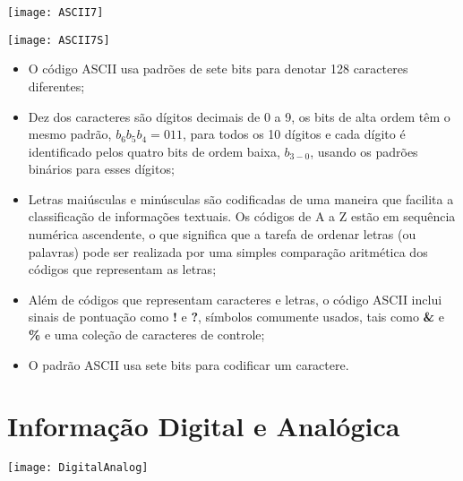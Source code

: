 \begin{frame}{\insertsection}
    \centering
    \texttt{[image: ASCII7]} 
\end{frame}

\begin{frame}{\insertsection}
    \centering
    \texttt{[image: ASCII7S]} 
\end{frame}

\begin{frame}{\insertsection}
    \begin{itemize}
        \item O código ASCII usa padrões de sete bits para denotar 128 caracteres diferentes; 
        \item Dez dos caracteres são dígitos decimais de 0 a 9, os bits de alta ordem têm o mesmo padrão, $b_6b_5b_4 = 011$, para todos os 10 dígitos e cada dígito é identificado pelos quatro bits de ordem baixa, $b_{3-0}$, usando os padrões binários para esses dígitos; 
        \item Letras maiúsculas e minúsculas são codificadas de uma maneira que facilita a classificação de informações textuais. Os códigos de A a Z estão em sequência numérica ascendente, o que significa que a tarefa de ordenar letras (ou palavras) pode ser realizada por uma simples comparação aritmética dos códigos que representam as letras;
    \end{itemize}
\end{frame}

\begin{frame}{\insertsection}
    \begin{itemize}
        \item Além de códigos que representam caracteres e letras, o código ASCII inclui sinais de pontuação como \textbf{!} e \textbf{?}, símbolos comumente usados, tais como \textbf{\&} e \textbf{\%} e uma coleção de caracteres de controle;
        \item O padrão ASCII usa sete bits para codificar um caractere.
    \end{itemize}
\end{frame}

\section{Informação Digital e Analógica}

\begin{frame}{\insertsection}
    \centering
    \texttt{[image: DigitalAnalog]}     
\end{frame}

